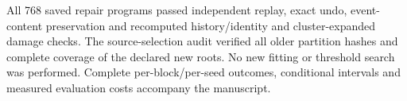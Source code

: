 All 768 saved repair programs passed independent replay, exact undo, event-content preservation and recomputed history/identity and cluster-expanded damage checks. The source-selection audit verified all older partition hashes and complete coverage of the declared new roots. No new fitting or threshold search was performed. Complete per-block/per-seed outcomes, conditional intervals and measured evaluation costs accompany the manuscript.
